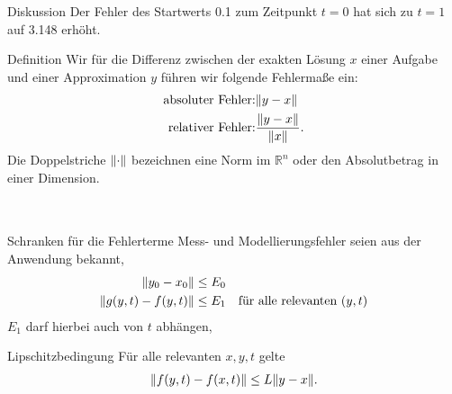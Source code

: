 \begin{frame}{Diskussion}
  Der Fehler des Startwerts 0.1 zum Zeitpunkt $t=0$ hat sich zu $t=1$ auf
  3.148 erhöht.

  \vspace{1cm}
  
\end{frame}

\begin{frame}[fragile]
\begin{block}{Definition}
    Wir für die Differenz zwischen der exakten Lösung $x$ einer
    Aufgabe und einer Approximation $y$ führen wir folgende Fehlermaße
    ein:
    \begin{align*}
      \text{absoluter Fehler:}& \lVert y-x\rVert\\
      \text{relativer Fehler:}& \frac{\lVert y-x\rVert}{\lVert x\rVert}.      
    \end{align*}
    Die Doppelstriche $\lVert\cdot\rVert$ bezeichnen eine Norm im
    $\mathbb R^n$ oder den Absolutbetrag in einer Dimension.
  \end{block}
  \begin{gather*}
    \begin{array}{cccc}
    \end{array}
  \end{gather*}
\end{frame}

\begin{frame}{Schranken für die Fehlerterme}
  Mess- und Modellierungsfehler seien aus der Anwendung bekannt,
  \begin{align*}
    \lVert y_0-x_0\rVert &\le E_0\\
    \lVert g(y,t)-f(y,t)\rVert &\le E_1 \quad\text{für alle relevanten $(y,t)$}
  \end{align*}
  $E_1$ darf hierbei auch von $t$ abhängen,
  \pause
  \begin{block}{Lipschitzbedingung}
    Für alle relevanten $x,y,t$ gelte
    \begin{gather*}
      \lVert f(y,t) - f(x,t)\rVert \le L \lVert y-x\rVert.
    \end{gather*}
  \end{block}
\end{frame}

